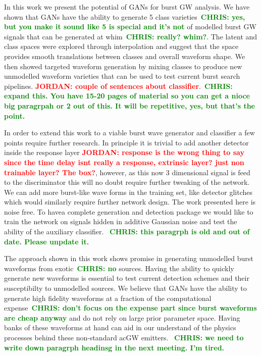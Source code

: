 \documentclass[12pt]{iopart}
\newcommand{\jordan}[1]{\textbf{\textcolor{red}{JORDAN: #1}}}
\newcommand{\chris}[1]{\textbf{\textcolor{green}{CHRIS: #1}}}
\begin{document}
%
In this work we present the potential of \acp{GAN} for
burst \ac{GW} analysis. We have shown that \acp{GAN} have the ability to generate 5
class varieties~\chris{yes, but you make it sound like 5 is special and it's
not} of modelled burst \ac{GW} signals that can be generated at
whim~\chris{really? whim?}. The latent and class spaces were explored through interpolation and
suggest that the space provides smooth translations between classes and overall
waveform shape. We then showed targeted waveform generation by mixing classes
to produce new unmodelled waveform varieties that can be used to test current
burst search pipelines. \jordan{couple of sentences about
classifier}.~\chris{expand this. You have 15-20 pages of material so you can
get a nioce big paragrpah or 2 out of this. It will be repetitive, yes, but
that's the point.} 

%
In order to extend this work to a viable burst wave generator and classifier a
few points require further research. In principle it is trivial to add another
detector inside the response layer \jordan{response is the wrong thing to say
since the time delay isnt really a response, extrinsic layer? just non
trainable layer? The box?}, however, as this now 3 dimensional signal is feed
to the discriminator this will no doubt require further tweaking of the
network. We can add more burst-like wave forms in the training set, like
detector glitches which would similarly require further network design. The
work presented here is noise free. To havea complete generation and detection
package we would like to train the network on signals hidden in additive
Gaussian noise and test the ability of the auxiliary classifier. 
~\chris{this paragrph is old and out of date. Please unpdate it.}

The approach shown in this work shows promise in generating unmodelled burst
waveforms from exotic~\chris{no} sources. Having the ability to quickly
generate new waveforms is essential to test current detection schemes and their
susceptibilty to unmodelled sources. We believe that \acp{GAN} have the ability
to generate high fidelity waveforms at a fraction of the computational
expense~\chris{don't focus on the expense part since burst waveforms are cheap
anyway} and do not rely on large prior parameter space. Having banks of these
waveforms at hand can aid in our understand of the physics processes behind
these non-standard ac{GW} emitters.  
~\chris{we need to write down paragrph headinsg in the next meeting. I'm tired.}
\end{document}
